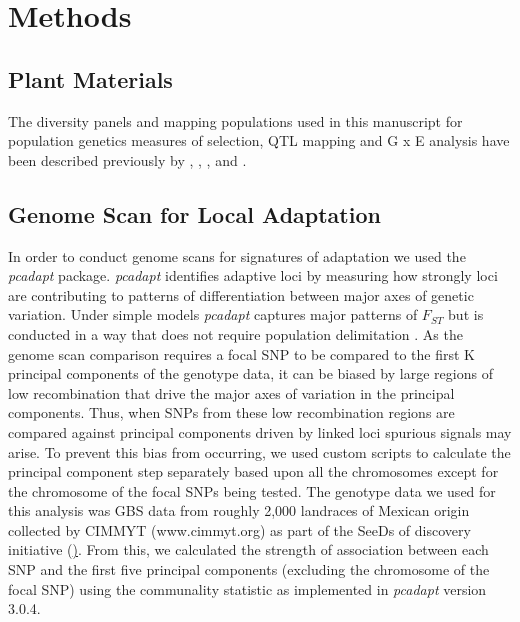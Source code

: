 \section{Methods}

\subsection{Plant Materials}
The diversity panels and mapping populations used in this manuscript for population genetics measures of selection, QTL mapping and G x E analysis have been described previously by \citep{wang2020-mp}, \citep{gates2019-xu}, \citep{romero_navarro2017-cn}, \citep{janzen2021-lz} and \citep{perez-limon2022-lg}. 

\subsection{Genome Scan for Local Adaptation}
In order to conduct genome scans for signatures of adaptation we used the \textit{pcadapt} \citep{luu2017-ws} package.
\textit{pcadapt} identifies adaptive loci by measuring how strongly loci are contributing to patterns of differentiation between major axes of genetic variation.
Under simple models \textit{pcadapt} captures major patterns of $F_{ST}$  but is conducted in a way that does not require population delimitation \citep{duforet2014genome}.
As the genome scan comparison requires a focal SNP to be compared to the first K principal components of the genotype data, it can be biased by large regions of low recombination that drive the major axes of variation in the principal components.
Thus, when SNPs from these low recombination regions are compared against principal components driven by linked loci spurious signals may arise.
To prevent this bias from occurring, we used custom scripts to calculate the principal component step separately based upon all the chromosomes except for the chromosome of the focal SNPs being tested.
The genotype data we used for this analysis was GBS data from roughly 2,000 landraces of Mexican origin collected by CIMMYT (www.cimmyt.org) as part of the SeeDs of discovery initiative (\href{https://www.cimmyt.org/projects/seeds-of-discovery-seed/}).
From this, we calculated the strength of association between each SNP and the first five principal components (excluding the chromosome of the focal SNP) using the communality statistic as implemented in \textit{pcadapt} version 3.0.4.


